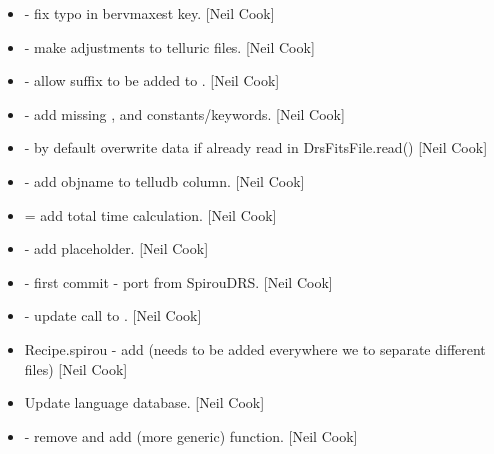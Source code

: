 \documentclass[a4paper,10pt,english]{report}
\begin{document}
\begin{itemize}
\item {} 
 - fix typo in bervmaxest key.
{[}Neil Cook{]}

\item {} 
 - make adjustments to
telluric files. {[}Neil Cook{]}

\item {} 
 - allow suffix to be
added to . {[}Neil Cook{]}

\item {} 
 - add missing
,  and  constants/keywords. {[}Neil
Cook{]}

\item {} 
 - by default overwrite data if already read in
DrsFitsFile.read() {[}Neil Cook{]}

\item {} 
 - add objname to telludb column. {[}Neil Cook{]}

\item {} 
 = add total time calculation.
{[}Neil Cook{]}

\item {} 
 - add  placeholder.
{[}Neil Cook{]}

\item {} 
 - first commit - port from
SpirouDRS. {[}Neil Cook{]}

\item {} 
 - update call to
. {[}Neil Cook{]}

\item {} 
Recipe.spirou - add  (needs to be added everywhere we
 to separate different files) {[}Neil Cook{]}

\item {} 
Update language database. {[}Neil Cook{]}

\item {} 
 - remove  and add (more generic)
 function. {[}Neil Cook{]}


\end{itemize}
\end{document}
